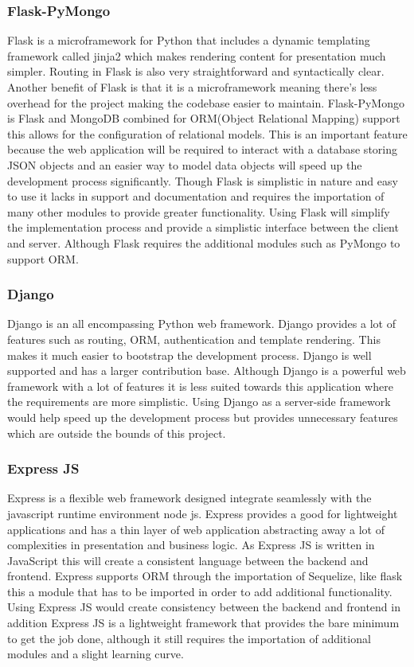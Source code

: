 \documentclass[onecolumn, draftclsnofoot,10pt, compsoc]{IEEEtran}
\begin{document}
\subsubsection{Flask-PyMongo}
Flask is a microframework for Python that includes a dynamic templating framework called jinja2 which makes rendering content for presentation much simpler. Routing in Flask is also very straightforward and syntactically clear. Another benefit of Flask is that it is a microframework meaning there’s less overhead for the project making the codebase easier to maintain. Flask-PyMongo is Flask and MongoDB combined for ORM(Object Relational Mapping) support this allows for the configuration of relational models. This is an important feature because the web application will be required to interact with a database storing JSON objects and an easier way to model data objects will speed up the development process significantly. Though Flask is simplistic in nature and easy to use it lacks in support and documentation and requires the importation of many other modules to provide greater functionality. Using Flask will simplify the implementation process and provide a simplistic interface between the client and server. Although Flask requires the additional modules such as PyMongo to support ORM.
\subsubsection{Django}
Django is an all encompassing Python web framework. Django provides a lot of features such as routing, ORM, authentication and template rendering. This makes it much easier to bootstrap the development process. Django is well supported and has a larger contribution base. Although Django is a powerful web framework with a lot of features it is less suited towards this application where the requirements are more simplistic. Using Django as a server-side framework would help speed up the development process but provides unnecessary features which are outside the bounds of this project.  
\subsubsection{Express JS}
Express is a flexible web framework designed integrate seamlessly with the javascript runtime environment node js. Express provides a good for lightweight applications and has a thin layer of web application abstracting away a lot of complexities in presentation and business logic. As Express JS is written in JavaScript this will create a consistent language between the backend and frontend. Express supports ORM through the importation of Sequelize, like flask this a module that has to be imported in order to add additional functionality. Using Express JS would create consistency between the backend and frontend in addition Express JS is a lightweight framework that provides the bare minimum to get the job done, although it still requires the importation of additional modules and a slight learning curve.
\end{document}

